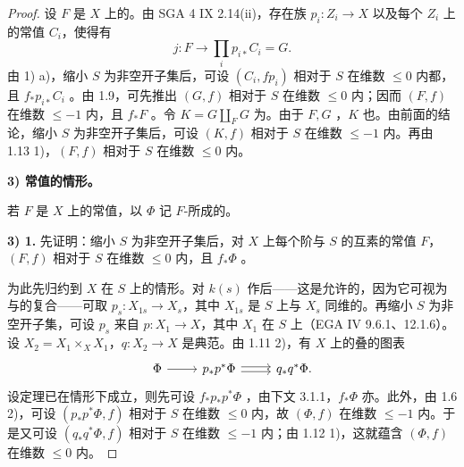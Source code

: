 \begin{proof}
设 $F$ 是 $X$ 上的。由 SGA 4 IX 2.14(ii)，存在族 $p_i:Z_i\to X$ 以及每个 $Z_i$ 上的常值 $C_i$，使得有
\[j:F\longrightarrow\prod_i p_{i*}C_i=G.\]
由 1) a)，缩小 $S$ 为非空开子集后，可设 $(C_i,fp_i)$ 相对于 $S$ 在维数 $\leq0$ 内都，且 $f_*p_{i*}C_i$ 。由 1.9，可先推出 $(G,f)$ 相对于 $S$ 在维数 $\leq0$ 内；因而 $(F,f)$ 在维数 $\leq-1$ 内，且 $f_*F$ 。令 $K=G\amalg_F G$ 为。由于 $F,G$ ，$K$ 也。由前面的结论，缩小 $S$ 为非空开子集后，可设 $(K,f)$ 相对于 $S$ 在维数 $\leq-1$ 内。再由 1.13 1)，$(F,f)$ 相对于 $S$ 在维数 $\leq0$ 内。

\textbf{3) 常值的情形。}

若 $F$ 是 $X$ 上的常值，以 $\Phi$ 记 $F$-所成的。

\textbf{3) 1.} 先证明：缩小 $S$ 为非空开子集后，对 $X$ 上每个阶与 $S$ 的互素的常值 $F$，$(F,f)$ 相对于 $S$ 在维数 $\leq0$ 内，且 $f_*\Phi$ 。

为此先归约到 $X$ 在 $S$ 上的情形。对 $k(s)$ 作后——这是允许的，因为它可视为与的复合——可取 $p_s:X_{1s}\to X_s$，其中 $X_{1s}$ 是 $S$ 上与 $X_s$ 同维的。再缩小 $S$ 为非空开子集，可设 $p_s$ 来自 $p:X_1\to X$，其中 $X_1$ 在 $S$ 上（EGA IV 9.6.1、12.1.6）。设 $X_2=X_1\times_X X_1$，$q:X_2\to X$ 是典范。由 1.11 2)，有 $X$ 上的叠的图表
\[
\begin{tikzcd}
\Phi\arrow[r]&p_*p^*\Phi\arrow[r,shift left=.45ex]\arrow[r,shift right=.45ex]&q_*q^*\Phi.
\end{tikzcd}
\]
设定理已在情形下成立，则先可设 $f_*p_*p^*\Phi$ ，由下文 3.1.1，$f_*\Phi$ 亦。此外，由 1.6 2)，可设 $(p_*p^*\Phi,f)$ 相对于 $S$ 在维数 $\leq0$ 内，故 $(\Phi,f)$ 在维数 $\leq-1$ 内。于是又可设 $(q_*q^*\Phi,f)$ 相对于 $S$ 在维数 $\leq-1$ 内；由 1.12 1)，这就蕴含 $(\Phi,f)$ 在维数 $\leq0$ 内。


\end{proof}
